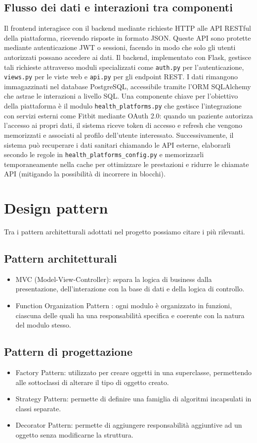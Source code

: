 \documentclass[12pt,a4paper,oneside]{report}
\begin{document}
\subsection{Flusso dei dati e interazioni tra componenti}
Il frontend interagisce con il backend mediante richieste HTTP alle API RESTful della piattaforma, ricevendo risposte in formato JSON.
Queste API sono protette mediante autenticazione JWT o sessioni, facendo in modo che solo gli utenti autorizzati possano accedere ai dati. Il backend, implementato con Flask, gestisce tali richieste attraverso moduli specializzati come \texttt{auth.py} per l'autenticazione, \texttt{views.py} per le viste web e \texttt{api.py} per gli endpoint REST.
I dati rimangono immagazzinati nel database PostgreSQL, accessibile tramite l'ORM SQLAlchemy \cite{sqlalchemy} che astrae le interazioni a livello SQL.
Una componente chiave per l'obiettivo della piattaforma è il modulo \texttt{health\_platforms.py} che gestisce l'integrazione con servizi esterni come Fitbit mediante OAuth 2.0: quando un paziente autorizza l'accesso ai propri dati, il sistema riceve token di accesso e refresh che vengono memorizzati e associati al profilo dell'utente interessato.
Successivamente, il sistema può recuperare i dati sanitari chiamando le API esterne, elaborarli secondo le regole in \texttt{health\_platforms\_config.py} e memorizzarli temporaneamente nella cache per ottimizzare le prestazioni e ridurre le chiamate API (mitigando la possibilità di incorrere in blocchi).

\section{Design pattern}
Tra i pattern architetturali adottati nel progetto possiamo citare i più rilevanti.
\subsection{Pattern architetturali}
\begin{itemize}
    \item MVC (Model-View-Controller): separa la logica di business dalla presentazione, dell'interazione con la base di dati e della logica di controllo.
    \item Function Organization Pattern : ogni modulo è organizzato in funzioni, ciascuna delle quali ha una responsabilità specifica e coerente con la natura del modulo stesso.
\end{itemize}
\subsection{Pattern di progettazione}
\begin{itemize}
    \item Factory Pattern: utilizzato per creare oggetti in una superclasse, permettendo alle sottoclassi di alterare il tipo di oggetto creato.
    \item Strategy Pattern: permette di definire una famiglia di algoritmi incapsulati in classi separate.
    \item Decorator Pattern: permette di aggiungere responsabilità aggiuntive ad un oggetto senza modificarne la struttura.
\end{itemize}
\end{document}
